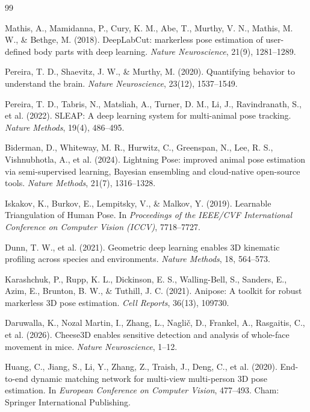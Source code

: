 \documentclass[pdflatex, sn-nature]{sn-jnl}
\theoremstyle{thmstyleone}%
\theoremstyle{thmstyletwo}%
\theoremstyle{thmstylethree}%
\begin{document}
\FloatBarrier

\begin{thebibliography}{99}

 Mathis, A., Mamidanna, P., Cury, K. M., Abe, T., Murthy, V. N., Mathis, M. W., \& Bethge, M. (2018). DeepLabCut: markerless pose estimation of user-defined body parts with deep learning. \textit{Nature Neuroscience}, 21(9), 1281--1289.

 Pereira, T. D., Shaevitz, J. W., \& Murthy, M. (2020). Quantifying behavior to understand the brain. \textit{Nature Neuroscience}, 23(12), 1537--1549.

 Pereira, T. D., Tabris, N., Matsliah, A., Turner, D. M., Li, J., Ravindranath, S., et al. (2022). SLEAP: A deep learning system for multi-animal pose tracking. \textit{Nature Methods}, 19(4), 486--495.

 Biderman, D., Whiteway, M. R., Hurwitz, C., Greenspan, N., Lee, R. S., Vishnubhotla, A., et al. (2024). Lightning Pose: improved animal pose estimation via semi-supervised learning, Bayesian ensembling and cloud-native open-source tools. \textit{Nature Methods}, 21(7), 1316--1328.

 Iskakov, K., Burkov, E., Lempitsky, V., \& Malkov, Y. (2019). Learnable Triangulation of Human Pose. In \textit{Proceedings of the IEEE/CVF International Conference on Computer Vision (ICCV)}, 7718--7727.

 Dunn, T. W., et al. (2021). Geometric deep learning enables 3D kinematic profiling across species and environments. \textit{Nature Methods}, 18, 564--573.

 Karashchuk, P., Rupp, K. L., Dickinson, E. S., Walling-Bell, S., Sanders, E., Azim, E., Brunton, B. W., \& Tuthill, J. C. (2021). Anipose: A toolkit for robust markerless 3D pose estimation. \textit{Cell Reports}, 36(13), 109730.

 Daruwalla, K., Nozal Martin, I., Zhang, L., Naglič, D., Frankel, A., Rasgaitis, C., et al. (2026). Cheese3D enables sensitive detection and analysis of whole-face movement in mice. \textit{Nature Neuroscience}, 1--12.

 Huang, C., Jiang, S., Li, Y., Zhang, Z., Traish, J., Deng, C., et al. (2020). End-to-end dynamic matching network for multi-view multi-person 3D pose estimation. In \textit{European Conference on Computer Vision}, 477--493. Cham: Springer International Publishing.


\end{thebibliography}
\end{document}
